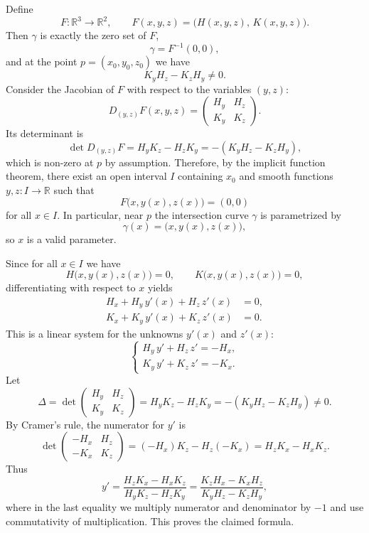 \begin{solution}
Define
	\[
	F : \mathbb{R}^3 \to \mathbb{R}^2, \qquad
	F(x,y,z) = \bigl(H(x,y,z),\,K(x,y,z)\bigr).
	\]
	Then $\gamma$ is exactly the zero set of $F$,
	\[
	\gamma = F^{-1}(0,0),
	\]
	and at the point $p=(x_0,y_0,z_0)$ we have
	\[
	K_y H_z - K_z H_y \neq 0.
	\]
	Consider the Jacobian of $F$ with respect to the variables $(y,z)$:
	\[
	D_{(y,z)}F(x,y,z)
	=
	\begin{pmatrix}
		H_y & H_z \\
		K_y & K_z
	\end{pmatrix}.
	\]
	Its determinant is
	\[
	\det D_{(y,z)}F
	= H_y K_z - H_z K_y
	= -(K_y H_z - K_z H_y),
	\]
	which is non-zero at $p$ by assumption.  Therefore, by the implicit function
	theorem, there exist an open interval $I$ containing $x_0$ and smooth
	functions $y,z : I \to \mathbb{R}$ such that
	\[
	F\bigl(x,y(x),z(x)\bigr) = (0,0)
	\]
	for all $x\in I$.  In particular, near $p$ the intersection curve $\gamma$ is
	parametrized by
	\[
	\gamma(x) = \bigl(x,y(x),z(x)\bigr),
	\]
	so $x$ is a valid parameter.
	
	Since for all $x\in I$ we have
	\[
	H\bigl(x,y(x),z(x)\bigr) = 0,
	\qquad
	K\bigl(x,y(x),z(x)\bigr) = 0,
	\]
	differentiating with respect to $x$ yields
	\begin{align*}
		H_x + H_y\,y'(x) + H_z\,z'(x) &= 0, \\
		K_x + K_y\,y'(x) + K_z\,z'(x) &= 0.
	\end{align*}
	This is a linear system for the unknowns $y'(x)$ and $z'(x)$:
	\[
	\begin{cases}
		H_y\,y' + H_z\,z' = -H_x,\\
		K_y\,y' + K_z\,z' = -K_x.
	\end{cases}
	\]
	Let
	\[
	\Delta = \det
	\begin{pmatrix}
		H_y & H_z \\
		K_y & K_z
	\end{pmatrix}
	= H_y K_z - H_z K_y
	= -(K_y H_z - K_z H_y) \neq 0.
	\]
	By Cramer's rule, the numerator for $y'$ is
	\[
	\det
	\begin{pmatrix}
		-H_x & H_z \\
		-K_x & K_z
	\end{pmatrix}
	= (-H_x)K_z - H_z(-K_x)
	= H_z K_x - H_x K_z.
	\]
	Thus
	\[
	y'
	= \frac{H_z K_x - H_x K_z}{H_y K_z - H_z K_y}
	= \frac{K_z H_x - K_x H_z}{K_y H_z - K_z H_y},
	\]
	where in the last equality we multiply numerator and denominator by $-1$
	and use commutativity of multiplication.
	This proves the claimed formula.
\end{solution}

